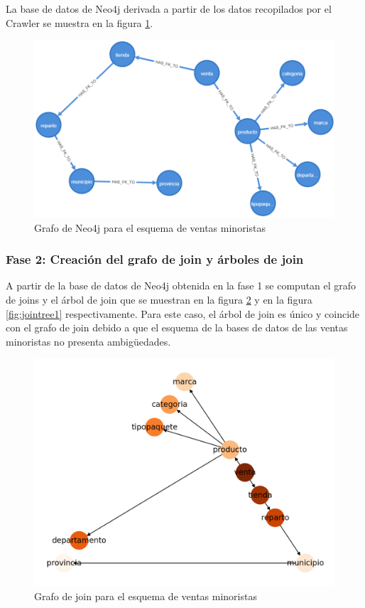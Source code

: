La base de datos de Neo4j derivada a 
partir de los datos recopilados por el Crawler se muestra en la figura \ref{fig:catalogexp1}.

\begin{figure}[H]
  \centering
  \includegraphics[scale=0.4]{Graphics/graph (1).png}
  \caption{Grafo de Neo4j para el esquema de ventas minoristas}
  \label{fig:catalogexp1}
\end{figure}

\subsubsection{Fase 2: Creaci\'on del grafo de join y \'arboles de join}

A partir de la base de datos de Neo4j obtenida en la fase 1 se computan el grafo de joins y el \'arbol de 
join que se muestran en la figura \ref{fig:graphjoin1} y en la figura \ref{fig:jointree1} respectivamente. Para este caso, 
el \'arbol de join es \'unico y coincide  con el grafo de join debido a que el esquema de la bases de datos de 
las ventas minoristas no presenta ambigüedades.

\begin{figure}[H]
  \centering
  \includegraphics[scale=0.6]{Graphics/joingraph1.png}
  \caption{Grafo de join para el esquema de ventas minoristas}
  \label{fig:graphjoin1}
\end{figure}

